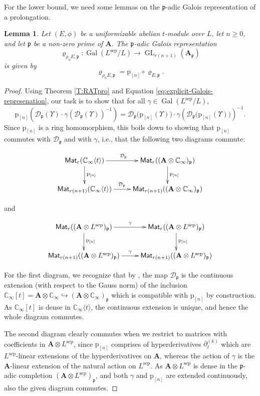 \documentclass[10pt,a4paper]{amsart}
\theoremstyle{plain} %
\newtheorem{Lemma}[Theorem]{Lemma}
\theoremstyle{definition}
\theoremstyle{remark}
\newcommand{\CC}{\mathbb{C}}
\newcommand{\fp}{\mathfrak{p}}  %
\newcommand{\bA}{\mathbf{A}}
\newcommand{\Gal}{\operatorname{Gal}}
\newcommand{\Mat}{\mathsf{Mat}}
\newcommand{\GL}{\operatorname{GL}}
\newcommand{\KI}{\mathbb{K}_{\infty}}  %
\newcommand{\CI}{\CC_{\infty}}  %
\newcommand{\cs}[1]{\langle #1 \rangle} %
\newcommand{\sep}{\mathrm{sep}}
\newcommand{\hdte}[1]{\partial_t^{(#1)}}  %
\newcommand{\D}{\mathcal{D}} %
\newcommand{\prol}[1]{\mathrm{p}_{[#1]}}
\numberwithin{equation}{subsection}
\begin{document}
For the lower bound, we need some lemmas on the $\fp$-adic Galois representation of a prolongation.


\begin{Lemma}\label{lem:repr-of-prol}
    Let $(E,\phi)$ be a uniformizable abelian $t$-module over $L$, let $n\geq 0$, and let $\fp$ be a non-zero prime of $\bA$. The $\fp$-adic Galois representation 
    \[ \varrho_{\rho_nE,\fp}:\Gal(L^\sep/L)\to \GL_{r(n+1)}(\bA_\fp) \] is given by
    \[ \varrho_{\rho_nE,\fp} = \prol{n}\circ \varrho_{E,\fp}. \]
\end{Lemma}

\begin{proof}
    Using Theorem \ref{T:RATpro} and Equation \eqref{eq:explicit-Galois-represenation}, our task is to show that for all $\gamma\in \Gal(L^\sep/L)$,
    \begin{equation}\label{eq:identity-for-gal-rep}
        \prol{n}\left( \D_\fp(\Upsilon)\cdot \gamma(\D_\fp(\Upsilon))^{-1} \right) = \D_\fp\bigl(\prol{n}(\Upsilon)\bigr)\cdot \gamma\left(\D_\fp\bigl(\prol{n}(\Upsilon)\bigr)\right)^{-1}.
    \end{equation}
    Since $\prol{n}$ is a ring homomorphism, this boils down to showing that $\prol{n}$ commutes with $\D_\fp$ and with $\gamma$, i.e., that the following two diagrams commute:
    
\[    \xymatrix{ \Mat_r(\CI\cs{t}) \ar[r]^(.47){\D_\fp} \ar[d]^{\prol{n}} &  \Mat_r((\bA\otimes \CI)_\fp) \ar[d]^{\prol{n}} \\
    \Mat_{r(n+1)}(\CI\cs{t}) \ar[r]^(.45){\D_\fp} & \Mat_{r(n+1)}((\bA\otimes \CI)_\fp)        
    }\]
    
    and
    
    \[ \xymatrix{ \Mat_r((\bA\otimes L^\sep)_\fp) \ar[r]^{\gamma} \ar[d]^{\prol{n}} &  \Mat_r((\bA\otimes L^\sep)_\fp) \ar[d]^{\prol{n}} \\
    \Mat_{r(n+1)}((\bA\otimes L^\sep)_\fp) \ar[r]^{\gamma} & \Mat_{r(n+1)}((\bA\otimes L^\sep)_\fp)        
    }\]
    
For the first diagram, we recognize that by \cite[Remark 2.18 \& Prop.~2.3]{am:naamcigp}, the map $\D_{\fp}$ is the continuous extension (with respect to the Gauss norm) of the inclusion $\CI[t]=\bA\otimes \CI \hookrightarrow (\bA\otimes \CI)_\fp$ which is compatible with $\prol{n}$ by construction. As $\CI[t]$ is dense in $\CI\cs{t}$, the continuous extension is unique, and hence the whole diagram commutes.

The second diagram clearly commutes when we restrict to matrices with coefficients in $\bA\otimes L^\sep$, since $\prol{n}$ comprises of hyperderivatives $\hdte{k}$ which are $L^\sep$-linear extensions of the hyperderivatives on $\bA$, whereas the action of $\gamma$ is the $\bA$-linear extension of the natural action on $L^\sep$. 
As $\bA\otimes L^\sep$ is dense in the $\fp$-adic completion $(\bA\otimes L^\sep)_\fp$, and both $\gamma$ and $\prol{n}$ are extended continuously, also the given diagram commutes.
\end{proof}
\end{document}

